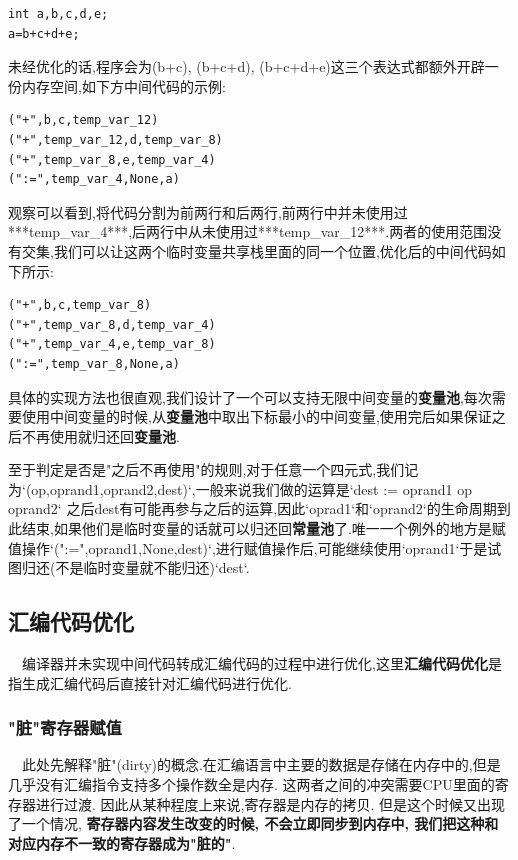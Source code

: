 \documentclass{article}
\begin{document}
\begin{verbatim}
int a,b,c,d,e;
a=b+c+d+e;
\end{verbatim}

未经优化的话,程序会为(b+c), (b+c+d), (b+c+d+e)这三个表达式都额外开辟一份内存空间,如下方中间代码的示例:

\begin{verbatim}
("+",b,c,temp_var_12)
("+",temp_var_12,d,temp_var_8)
("+",temp_var_8,e,temp_var_4)
(":=",temp_var_4,None,a)
\end{verbatim}

观察可以看到,将代码分割为前两行和后两行,前两行中并未使用过***temp\_var\_4***,后两行中从未使用过***temp\_var\_12***.两者的使用范围没有交集,我们可以让这两个临时变量共享栈里面的同一个位置,优化后的中间代码如下所示:

\begin{verbatim}
("+",b,c,temp_var_8)
("+",temp_var_8,d,temp_var_4)
("+",temp_var_4,e,temp_var_8)
(":=",temp_var_8,None,a)
\end{verbatim}

具体的实现方法也很直观,我们设计了一个可以支持无限中间变量的\textbf{变量池},每次需要使用中间变量的时候,从\textbf{变量池}中取出下标最小的中间变量,使用完后如果保证之后不再使用就归还回\textbf{变量池}.


至于判定是否是"之后不再使用"的规则,对于任意一个四元式,我们记为`(op,oprand1,oprand2,dest)`,一般来说我们做的运算是`dest := oprand1 op oprand2` 之后dest有可能再参与之后的运算,因此`oprad1`和`oprand2`的生命周期到此结束,如果他们是临时变量的话就可以归还回\textbf{常量池}了.唯一一个例外的地方是赋值操作`(":=",oprand1,None,dest)`,进行赋值操作后,可能继续使用`oprand1`于是试图归还(不是临时变量就不能归还)`dest`.

\subsection{汇编代码优化}

\quad\ \ 编译器并未实现中间代码转成汇编代码的过程中进行优化,这里\textbf{汇编代码优化}是指生成汇编代码后直接针对汇编代码进行优化.

\subsubsection{"脏"寄存器赋值}

\quad\ \ 此处先解释"脏"(dirty)的概念.在汇编语言中主要的数据是存储在内存中的,但是几乎没有汇编指令支持多个操作数全是内存. 这两者之间的冲突需要CPU里面的寄存器进行过渡. 因此从某种程度上来说,寄存器是内存的拷贝. 但是这个时候又出现了一个情况, \textbf{寄存器内容发生改变的时候, 不会立即同步到内存中, 我们把这种和对应内存不一致的寄存器成为"脏的"}.
\end{document}
